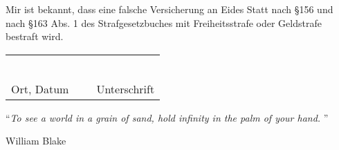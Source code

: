 \documentclass[
11pt, %
oneside, %
english, %
singlespacing, %
parskip, %
headsepline, %
]{MastersDoctoralThesis} %
\begin{document}
\begin{declaration}
\noindent Mir ist bekannt, dass eine falsche Versicherung an Eides Statt nach \S 156 und nach \S 163 Abs. 1 des Strafgesetzbuches mit Freiheitsstrafe oder Geldstrafe bestraft wird.\\[.4cm]


\begin{center}
	\begin{tabu} to .95\textwidth { X[l] X[c] X[r] }
		~ & ~ & ~ \\
		  \\
		Ort, Datum  & ~  & Unterschrift \\
	\end{tabu}
\end{center}

\end{declaration}

\cleardoublepage


\vspace*{0.2\textheight}

\noindent\enquote{\itshape To see a world in a grain of sand, hold infinity in the palm of your hand. }\bigbreak

\hfill William Blake

\end{document}
